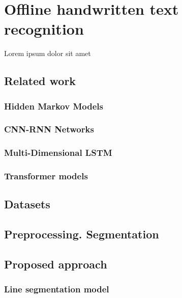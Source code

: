 \chapter{Offline handwritten text recognition}
\label{chap:ch3}

\par Lorem ipsum dolor sit amet

\section{Related work}
\label{subsec:ch3sec2subsec1}

\subsection{Hidden Markov Models}
\label{subsec:ch3sec2subsec1subsubsec1}

\subsection{CNN-RNN Networks}
\label{subsec:ch3sec2subsec1subsubsec2}

\subsection{Multi-Dimensional LSTM}
\label{subsec:ch3sec2subsec1subsubsec3}

\subsection{Transformer models}
\label{subsec:ch3sec2subsec1subsubsec4}

\section{Datasets}
\label{subsec:ch3sec2subsec2}

\section{Preprocessing. Segmentation}
\label{subsec:ch3sec2subsec3}

\section{Proposed approach}
\label{subsec:ch3sec2subsec4}

\subsection{Line segmentation model}
\label{subsec:ch3sec2subsec4subsubsec1}

